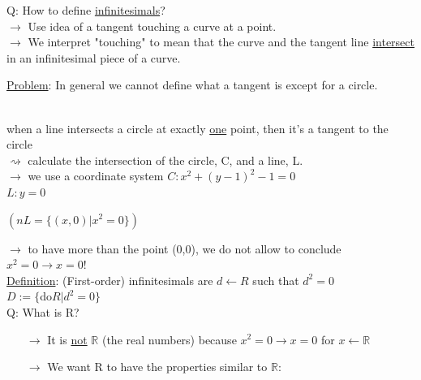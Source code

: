 \documentclass[a4paper, 12pt]{article}
\begin{document}
\begin{enumerate}
Q: How to define \underline{infinitesimals}?\\
$\rightarrow$ Use idea of a tangent touching a curve at a point.\\
$\rightarrow$ We interpret "touching" to mean that the curve and the tangent line \underline{intersect} in an infinitesimal piece of a curve.\\
\begin{center}
\end{center}
\underline{Problem}: In general we cannot define what a tangent is except for a circle.
\begin{centering}
\begin{multicols}{2}
\\
when a line intersects a circle at exactly \underline{one} point, then it's a tangent to the circle\\
$\rightsquigarrow$ calculate the intersection of the circle, C, and a line, L.\\
$\rightarrow$ we use a coordinate system
$C: x^2 + (y-1)^2 - 1 = 0$\\
$L: y=0 $
\end{multicols}
$(nL = \{(x,0) | x^2 = 0\})$\\
\end{centering}
$\rightarrow$ to have more than the point (0,0), we do not allow to conclude $x^2=0 \rightarrow x=0!$\\
\underline{Definition}: (First-order) infinitesimals are $d \leftarrow R$ such that $d^2=0$\\
$D:=\{$do$ R|d^2=0\}$\\
Q: What is R?
\begin{itemize}
\item[$\rightarrow$] It is \underline{not} $\mathbb{R}$ (the real numbers) because $x^2=0 \rightarrow x=0$ for $x \leftarrow \mathbb{R}$
\item[$\rightarrow$] We want R to have the properties similar to $\mathbb{R}$:

\end{itemize}
\end{enumerate}
\end{document}

